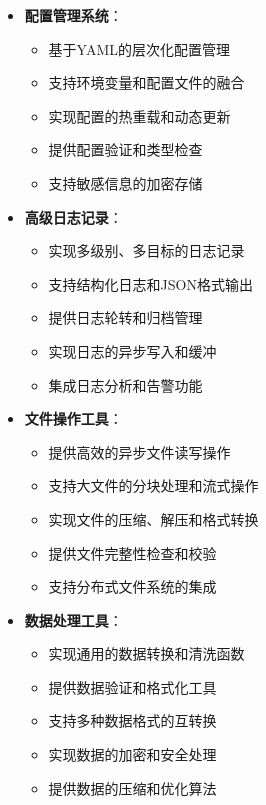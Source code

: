 \documentclass[12pt,a4paper]{article}
\begin{document}
\begin{itemize}
    \item \textbf{配置管理系统}：
        \begin{itemize}
            \item 基于YAML的层次化配置管理
            \item 支持环境变量和配置文件的融合
            \item 实现配置的热重载和动态更新
            \item 提供配置验证和类型检查
            \item 支持敏感信息的加密存储
        \end{itemize}
    
    \item \textbf{高级日志记录}：
        \begin{itemize}
            \item 实现多级别、多目标的日志记录
            \item 支持结构化日志和JSON格式输出
            \item 提供日志轮转和归档管理
            \item 实现日志的异步写入和缓冲
            \item 集成日志分析和告警功能
        \end{itemize}
    
    \item \textbf{文件操作工具}：
        \begin{itemize}
            \item 提供高效的异步文件读写操作
            \item 支持大文件的分块处理和流式操作
            \item 实现文件的压缩、解压和格式转换
            \item 提供文件完整性检查和校验
            \item 支持分布式文件系统的集成
        \end{itemize}
    
    \item \textbf{数据处理工具}：
        \begin{itemize}
            \item 实现通用的数据转换和清洗函数
            \item 提供数据验证和格式化工具
            \item 支持多种数据格式的互转换
            \item 实现数据的加密和安全处理
            \item 提供数据的压缩和优化算法
        \end{itemize}
    

\end{itemize}
\end{document}
